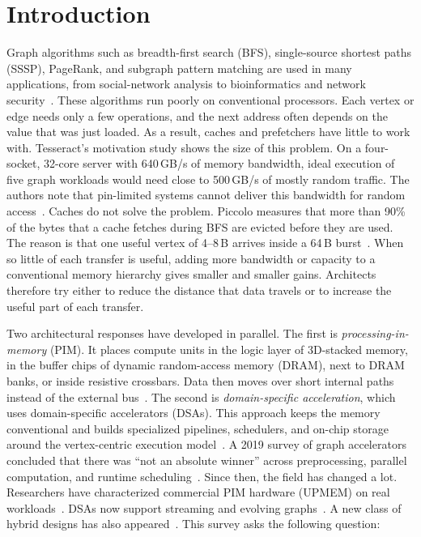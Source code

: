 \documentclass[journal,onecolumn]{IEEEtran}
\begin{document}
\section{Introduction}
Graph algorithms such as breadth-first search (BFS), single-source shortest paths (SSSP), PageRank, and subgraph pattern matching are used in many applications, from social-network analysis to bioinformatics and network security~\cite{ahn2015tesseract,ham2016graphicionado,asquini2025tc}. These algorithms run poorly on conventional processors. Each vertex or edge needs only a few operations, and the next address often depends on the value that was just loaded. As a result, caches and prefetchers have little to work with. Tesseract's motivation study shows the size of this problem. On a four-socket, 32-core server with 640\,GB/s of memory bandwidth, ideal execution of five graph workloads would need close to 500\,GB/s of mostly random traffic. The authors note that pin-limited systems cannot deliver this bandwidth for random access~\cite{ahn2015tesseract}. Caches do not solve the problem. Piccolo measures that more than 90\% of the bytes that a cache fetches during BFS are evicted before they are used. The reason is that one useful vertex of 4--8\,B arrives inside a 64\,B burst~\cite{shin2025piccolo}. When so little of each transfer is useful, adding more bandwidth or capacity to a conventional memory hierarchy gives smaller and smaller gains. Architects therefore try either to reduce the distance that data travels or to increase the useful part of each transfer.

Two architectural responses have developed in parallel. The first is \emph{processing-in-memory} (PIM). It places compute units in the logic layer of 3D-stacked memory, in the buffer chips of dynamic random-access memory (DRAM), next to DRAM banks, or inside resistive crossbars. Data then moves over short internal paths instead of the external bus~\cite{ahn2015tesseract,song2018graphr,gomezluna2022prim}. The second is \emph{domain-specific acceleration}, which uses domain-specific accelerators (DSAs). This approach keeps the memory conventional and builds specialized pipelines, schedulers, and on-chip storage around the vertex-centric execution model~\cite{ham2016graphicionado,mukkara2018hats,yan2019graphdyns}. A 2019 survey of graph accelerators concluded that there was ``not an absolute winner'' across preprocessing, parallel computation, and runtime scheduling~\cite{gui2019survey}. Since then, the field has changed a lot. Researchers have characterized commercial PIM hardware (UPMEM) on real workloads~\cite{gomezluna2022prim,barkhordar2025alphapim}. DSAs now support streaming and evolving graphs~\cite{rahman2021jetstream,zhao2022tdgraph,gao2023mega}. A new class of hybrid designs has also appeared~\cite{shin2025piccolo,shin2025fala,yenimol2026cograf}. This survey asks the following question:
\end{document}
